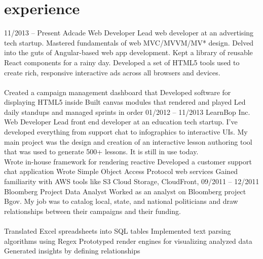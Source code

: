\documentclass[]{friggeri-cv}
\begin{document}
\section{experience}
\tabentry
  {11/2013 – Present}
  {Adcade}
  {Web Developer}
  {Lead web developer at an advertising tech startup. Mastered fundamentals of web MVC/MVVM/MV* design. Delved into the guts of Angular-based web app development. Kept a library of reusable React components for a rainy day. Developed a set of HTML5 tools used to create rich, responsive interactive ads across all browsers and devices.\\%
  \\%
    \bulletlist
    {Created a campaign management dashboard that }
    {Developed software for displaying HTML5 inside }
    {Built canvas modules that rendered and played }
    {Led daily standups and managed sprints in order }
  }
\tabentry
  {01/2012 – 11/2013}
  {LearnBop Inc.}
  {Web Developer}
  {Lead front end developer at an education tech startup. I've developed everything from support chat to infographics to interactive UIs. My main project was the design and creation of an interactive lesson authoring tool that was used to generate 500+ lessons. It is still in use today.
  \\%
    \bulletlist
    {Wrote in-house framework for rendering reactive }
    {Developed a customer support chat application }
    {Wrote Simple Object Access Protocol web services }
    {Gained familiarity with AWS tools like S3 Cloud Storage, CloudFront, }
  }
\pagebreak
\tabentry
  {09/2011 – 12/2011}
  {Bloomberg}
  {Project Data Analyst}
  {Worked as an analyst on Bloomberg project Bgov. My job was to catalog local, state, and national politicians and draw relationships between their campaigns and their funding.\\%
  \\%
    \bulletlist
    {Translated Excel spreadsheets into SQL tables}
    {Implemented text parsing algorithms using Regex}
    {Prototyped render engines for visualizing analyzed data}
    {Generated insights by defining relationships }
  }
\end{document}
